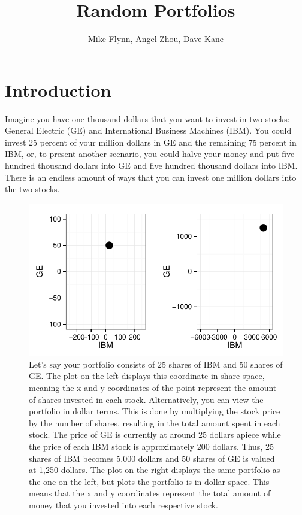 \documentclass{article}\usepackage{graphicx, color}
\makeatletter
\def\maxwidth{ %
  \ifdim\Gin@nat@width>\linewidth
    \linewidth
  \else
    \Gin@nat@width
  \fi
}
\newenvironment{knitrout}{}{} %
\makeatother
\begin{document}
\title{Random Portfolios}
\author{Mike Flynn, Angel Zhou, Dave Kane}
\maketitle

\section*{Introduction}




Imagine you have one thousand dollars that you want to invest in two stocks: General Electric (GE) and International Business Machines (IBM). You could invest 25 percent of your million dollars in GE and the remaining 75 percent in IBM, or, to present another scenario, you could halve your money and put five hundred thousand dollars into GE and five hundred thousand dollars into IBM. There is an endless amount of ways that you can invest one million dollars into the two stocks.

\begin{figure}[H]
\begin{knitrout}
\color{fgcolor}
\includegraphics[width=\maxwidth]{figure/figure1} 

\end{knitrout}

\caption{Let's say your portfolio consists of 25 shares of IBM and 50 shares of GE. The plot on the left displays this coordinate in share space, meaning the x and y coordinates of the point represent the amount of shares invested in each stock. Alternatively, you can view the portfolio in dollar terms. This is done by multiplying the stock price by the number of shares, resulting in the total amount spent in each stock. The price of GE is currently at around 25 dollars apiece while the price of each IBM stock is approximately 200 dollars. Thus, 25 shares of IBM becomes 5,000 dollars and 50 shares of GE is valued at 1,250 dollars. The plot on the right displays the same portfolio as the one on the left, but plots the portfolio is in dollar space. This means that the x and y coordinates represent the total amount of money that you invested into each respective stock.}
\end{figure}
\end{document}
